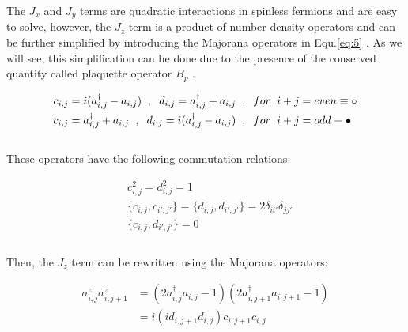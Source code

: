 \documentclass{article}
\begin{document}
\noindent The $J_x$ and $J_y$ terms are quadratic interactions in spinless fermions and are easy to solve, however, the $J_z$ term is a product of number density operators and can be further simplified by introducing the Majorana operators in Equ.\hspace{0.2mm}\ref{eq:5} \cite{schmull}. As we will see, this simplification can be done due to the presence of the conserved quantity called plaquette operator $B_p$ \cite{schmull}. 

\begin{equation}\label{eq:5}
	\begin{aligned}
		c_{i,j} &= i(a^{\dagger}_{i,j} - a_{i,j}) \hspace{2mm},\hspace{2mm} d_{i,j} = a^{\dagger}_{i,j} + a_{i,j} \hspace{2mm},\hspace{2mm} for \hspace{2mm} i+j=even \equiv \circ\\
		c_{i,j} &= a^{\dagger}_{i,j} + a_{i,j} \hspace{2mm},\hspace{2mm} d_{i,j} = i(a^{\dagger}_{i,j} - a_{i,j}) \hspace{2mm},\hspace{2mm} for \hspace{2mm} i+j=odd \equiv \color{black}\bullet\\
	\end{aligned}
\end{equation}\\

\noindent These operators have the following commutation relations:

\begin{equation}\label{eq:6}
	\begin{aligned}
		&c^2_{i,j} = d^2_{i,j} = 1\\
		&\{ c_{i,j},c_{i',j'} \} = \{ d_{i,j},d_{i',j'} \} = 2\delta_{ii'} \delta_{jj'}\\
		&\{ c_{i,j},d_{i',j'} \} = 0\\
	\end{aligned}
\end{equation}\\

\noindent Then, the $J_z$ term can be rewritten using the Majorana operators: 

\begin{equation}\label{eq:7}
	\begin{aligned}
		\sigma^{z}_{i,j}\sigma^{z}_{i,j+1} &=  (2a^{\dagger}_{i,j}a_{i,j} - 1) (2a^{\dagger}_{i,j+1}a_{i,j+1} - 1)\\
		&= i(id_{i,j+1}d_{i,j})c_{i,j+1}c_{i,j} 
	\end{aligned}
\end{equation}\\
\end{document}
